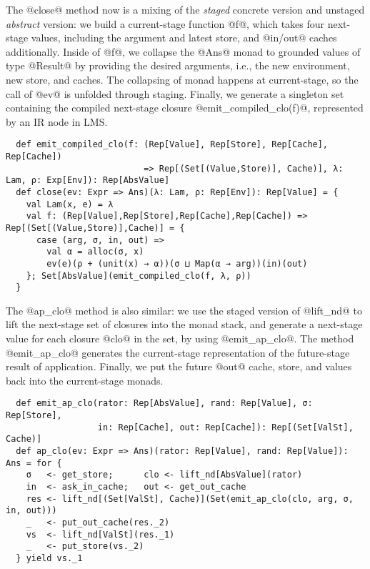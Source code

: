 The @close@ method now is a mixing of the \textit{staged} concrete version and
unstaged \textit{abstract} version: we build a current-stage function @f@, which
takes four next-stage values, including the argument and latest store, and
@in/out@ caches additionally. Inside of @f@, we collapse the @Ans@ monad to
grounded values of type @Result@ by providing the desired arguments, i.e., the
new environment, new store, and caches. The collapsing of monad happens at
current-stage, so the call of @ev@ is unfolded through staging. Finally, we
generate a singleton set containing the compiled next-stage closure
@emit_compiled_clo(f)@, represented by an IR node in LMS.

\begin{lstlisting}
  def emit_compiled_clo(f: (Rep[Value], Rep[Store], Rep[Cache], Rep[Cache])
                           => Rep[(Set[(Value,Store)], Cache)], λ: Lam, ρ: Exp[Env]): Rep[AbsValue]
  def close(ev: Expr => Ans)(λ: Lam, ρ: Rep[Env]): Rep[Value] = {
    val Lam(x, e) = λ
    val f: (Rep[Value],Rep[Store],Rep[Cache],Rep[Cache]) => Rep[(Set[(Value,Store)],Cache)] = {
      case (arg, σ, in, out) =>
        val α = alloc(σ, x)
        ev(e)(ρ + (unit(x) → α))(σ ⊔ Map(α → arg))(in)(out)
    }; Set[AbsValue](emit_compiled_clo(f, λ, ρ))
  }
\end{lstlisting}

The @ap_clo@ method is also similar: we use the staged version of @lift_nd@ to
lift the next-stage set of closures into the monad stack, and generate a
next-stage value for each closure @clo@ in the set, by using @emit_ap_clo@. The
method @emit_ap_clo@ generates the current-stage representation of the
future-stage result of application.
Finally, we put the future @out@ cache, store, and values back into
the current-stage monads.

\begin{lstlisting}
  def emit_ap_clo(rator: Rep[AbsValue], rand: Rep[Value], σ: Rep[Store],
                  in: Rep[Cache], out: Rep[Cache]): Rep[(Set[ValSt], Cache)]
  def ap_clo(ev: Expr => Ans)(rator: Rep[Value], rand: Rep[Value]): Ans = for {
    σ   <- get_store;      clo <- lift_nd[AbsValue](rator)
    in  <- ask_in_cache;   out <- get_out_cache
    res <- lift_nd[(Set[ValSt], Cache)](Set(emit_ap_clo(clo, arg, σ, in, out)))
    _   <- put_out_cache(res._2)
    vs  <- lift_nd[ValSt](res._1)
    _   <- put_store(vs._2)
  } yield vs._1
\end{lstlisting}


